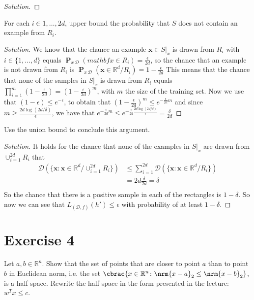 \documentclass[10pt, a4paper, twoside]{amsart}
\newcommand{\R}{\ensuremath{\mathbb{R}}}
\DeclarePairedDelimiter\cbrac\{\}
\DeclarePairedDelimiter{\nrm}\lVert\rVert
\renewcommand{\c}{\ensuremath{\colon}}
\renewcommand{\P}{\operatorname*{\ensuremath{\mathbf{P}}}}
\newenvironment{solution}
               {\let\oldqedsymbol=\qedsymbol
                \renewcommand{\qedsymbol}{$\blacktriangleleft$}
                \begin{proof}[Solution]}
               {\end{proof}
                \renewcommand{\qedsymbol}{\oldqedsymbol}}
\begin{document}
\begin{solution}
\end{solution}
For each $i \in {1,\ldots,2d}$, upper bound the probability that $S$ does not contain an example from $R_i$.\\
\begin{solution}
  We know that the chance an example $\mathbf{x} \in S|_x$ is drawn from $R_i$ with $i \in \{1,\ldots, d\}$ equals $\P_{x~\mathcal{D}}(mathbf{x}\in R_i) = \frac{\epsilon}{2d}$, so the chance that an example is not drawn from $R_i$ is $\P_{x~\mathcal{D}}(\mathbf{x}\in \R^d/R_i) = 1-\frac{\epsilon}{2d}$ This means that the chance that none of the samples in $S|_x$ is drawn from $R_i$ equals $\prod_{i = 1}^m(1-\frac{\epsilon}{2d}) = (1-\frac{\epsilon}{2d})^m$, with $m$ the size of the training set. Now we use that $(1-\epsilon)\leq e^{-\epsilon}$, to obtain that $(1-\frac{\epsilon}{2d})^m \leq e^{- \frac{\epsilon}{2d}m}$ and since $m \geq \frac{2d\log (2d/\delta)}{\epsilon}$, we have that $e^{- \frac{\epsilon}{2d}m} \leq e^{-\frac{\epsilon}{2d}\frac{2d\log (2d/\delta)}{\epsilon}}= \frac{\delta}{2d}$
\end{solution}
Use the union bound to conclude this argument. \\
\begin{solution}
  It holds for the chance that none of the examples in $S|_x$ are drawn from $\cup_{i=1}^{2d} R_i$  that
\begin{align*}
  \mathcal{D}(\{\mathbf{x}:\mathbf{x}\in \R^d/\cup_{i=1}^{2d} R_i\}) & \leq \sum_{i=1}^{2d} \mathcal{D}(\{\mathbf{x}:\mathbf{x}\in \R^d/R_i\}) \\
                                                                                 & = 2d\frac{\delta}{2d} = \delta \\
\end{align*}
So the chance that there is a positive sample in each of the rectangles is $1-\delta$. So now we can see that $L_{(\mathcal{D},f)}(h')\leq \epsilon$ with probability of at least $1 - \delta$.
\end{solution}

\section*{Exercise 4}
Let $a, b \in \R^n$. 
Show that the set of points that are closer to point $a$ than to point $b$ in Euclidean norm, 
i.e. the set $\cbrac{x \in \R^n \c \nrm{x-a}_2 \leq \nrm{x-b}_2}$, is a half space. 
Rewrite the half space in the form presented in the lecture: $w^T x \leq c$.
\end{document}
